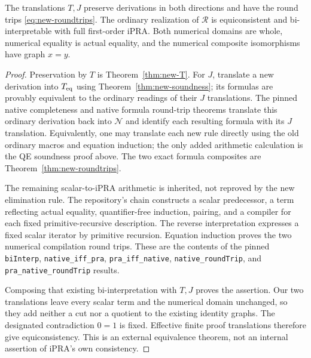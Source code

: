 \begin{theorem}
\label{thm:new-biinterpretability}
The translations $T,J$ preserve derivations in both directions and have the
round trips \eqref{eq:new-roundtrips}.  The ordinary realization of
$\mathcal R$ is equiconsistent and bi-interpretable with full first-order
iPRA.  Both numerical domains are whole, numerical equality is actual
equality, and the numerical composite isomorphisms have graph $x=y$.
\end{theorem}
\begin{proof}
Preservation by $T$ is Theorem~\ref{thm:new-T}.  For $J$, translate a new
derivation into $T_{\rm eq}$ using Theorem~\ref{thm:new-soundness}; its
formulas are provably equivalent to the ordinary readings of their $J$
translations.  The pinned
native completeness and native formula round-trip theorems translate this
ordinary derivation back into $\mathcal N$ and identify each resulting
formula with its $J$ translation.  Equivalently, one may translate each new
rule directly using the old ordinary macros and equation induction; the
only added arithmetic calculation is the QE soundness proof above.
The two exact formula composites are Theorem~\ref{thm:new-roundtrips}.

The remaining scalar-to-iPRA arithmetic is inherited, not reproved by the
new elimination rule.  The repository's chain constructs a scalar
predecessor, a term reflecting actual equality, quantifier-free induction,
pairing, and a compiler for each fixed primitive-recursive description.
The reverse interpretation expresses a fixed scalar iterator by primitive
recursion.  Equation induction proves the two numerical compilation round
trips.  These are the contents of the pinned \texttt{biInterp},
\texttt{native\_iff\_pra}, \texttt{pra\_iff\_native},
\texttt{native\_roundTrip}, and \texttt{pra\_native\_roundTrip} results.\cite{native,bridge}

Composing that existing bi-interpretation with $T,J$ proves the assertion.
Our two translations leave every scalar term and the numerical domain
unchanged, so they add neither a cut nor a quotient to the existing
identity graphs.  The designated contradiction $0=1$ is fixed.  Effective
finite proof translations therefore give equiconsistency.  This is an
external equivalence theorem, not an internal assertion of iPRA's own
consistency.
\end{proof}

